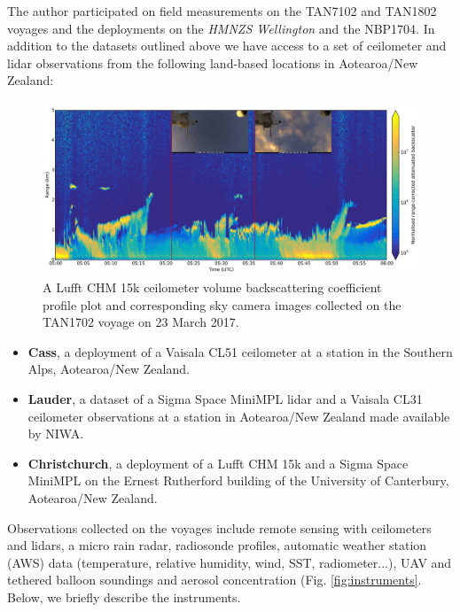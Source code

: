 \noindent
The author participated on field measurements on the TAN7102 and TAN1802 voyages and the deployments
on the \textit{HMNZS Wellington} and the NBP1704.
In addition to the datasets outlined above we have access to a set of
ceilometer and lidar observations from the following land-based locations in
Aotearoa/New Zealand:

\begin{figure}[t]
\includegraphics[width=\textwidth]{fig/chm15k_profile.png}
\caption{
A Lufft CHM 15k ceilometer volume backscattering coefficient profile plot
and corresponding sky camera images collected on the TAN1702 voyage
on 23 March 2017.
}
\label{fig:chm15k-profile}
\end{figure}

\begin{itemize}
\item \textbf{Cass}, a deployment of a Vaisala CL51 ceilometer at a station in the
Southern Alps, Aotearoa/New Zealand.
\item \textbf{Lauder}, a dataset of a Sigma Space MiniMPL lidar and a Vaisala CL31
ceilometer observations at a station in Aotearoa/New Zealand made available by NIWA.
\item \textbf{Christchurch}, a deployment of a Lufft CHM 15k and a Sigma Space MiniMPL on the
Ernest Rutherford building of the University of Canterbury, Aotearoa/New
Zealand.
\end{itemize}

Observations collected on the voyages include remote sensing with ceilometers and lidars,
a micro rain radar, radiosonde profiles, automatic weather station (AWS) data (temperature, relative humidity,
wind, SST, radiometer...), UAV and tethered balloon soundings and
aerosol concentration (Fig. \ref{fig:instruments}.
Below, we briefly describe the instruments.

